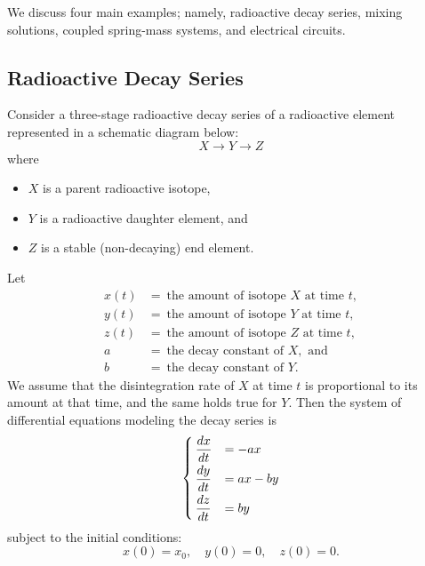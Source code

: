 We discuss four main examples; namely, radioactive decay series, mixing  solutions, coupled spring-mass systems, and electrical circuits.

\subsection{Radioactive Decay Series}
Consider a three-stage radioactive decay series of a radioactive element represented in a schematic diagram below:
\[
X \longrightarrow Y \longrightarrow Z
\]
where
\begin{itemize}[noitemsep]
	\item \( X \) is a parent radioactive isotope,
	\item \( Y \) is a radioactive daughter element, and
	\item \( Z\) is a stable (non-decaying) end element.
\end{itemize}
Let
\begin{align*}
	x(t) &=\ \text{the amount of isotope } X \text{ at time } t, \\
	y(t) &=\ \text{the amount of isotope } Y \text{ at time } t, \\
	z(t) &=\ \text{the amount of isotope } Z \text{ at time } t, \\
	a &=\ \text{the decay constant of } X, \text{    and} \\
	b &=\ \text{the decay constant of } Y.
\end{align*}    
We assume that the disintegration rate of $X$ at time $t$ is proportional to its amount at that time, and the same holds true for $Y$.
Then the system of differential equations modeling the decay series is
\begin{equation}\label{chap7-6-1}
\begin{cases}
	\smallskip
	\ds\frac{dx}{dt} &= -a x \\
	\smallskip
	\ds\frac{dy}{dt} &= ax - by\\
	\ds\frac{dz}{dt} &= by
\end{cases}
\end{equation}
subject to the initial conditions:
\[
x(0) = x_0, \quad y(0) = 0, \quad z(0) = 0.
\]

